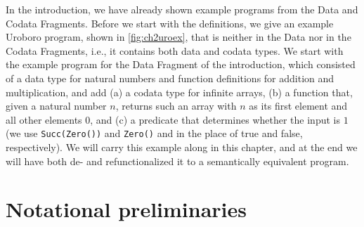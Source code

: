 In the introduction, we have already shown example programs from the Data and Codata Fragments. Before we start with the definitions, we give an example Uroboro program, shown in \autoref{fig:ch2uroex}, that is neither in the Data nor in the Codata Fragments, i.e., it contains both data and codata types. We start with the example program for the Data Fragment of the introduction, which consisted of a data type for natural numbers and function definitions for addition and multiplication, and add (a) a codata type for infinite arrays, (b) a function that, given a natural number $n$, returns such an array with $n$ as its first element and all other elements $0$, and (c) a predicate that determines whether the input is $1$ (we use \texttt{Succ(Zero())} and \texttt{Zero()} and in the place of true and false, respectively). We will carry this example along in this chapter, and at the end we will have both de- and refunctionalized it to a semantically equivalent program.

\section{Notational preliminaries}
\label{sec:uronotp}

